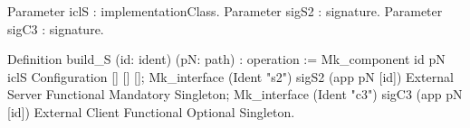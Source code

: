 Parameter iclS : implementationClass.
Parameter sigS2 : signature.
Parameter sigC3 : signature.

Definition build_S (id: ident) (pN: path) : operation :=
  Mk_component id pN iclS Configuration [] [] [];
  Mk_interface (Ident "s2") sigS2 (app pN [id]) 
               External Server Functional Mandatory Singleton;
  Mk_interface (Ident "c3") sigC3 (app pN [id]) 
               External Client Functional Optional Singleton.